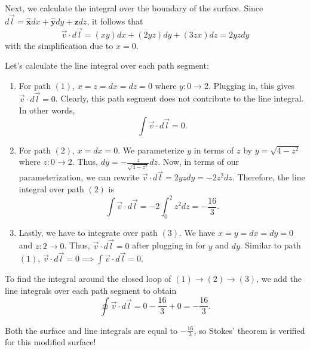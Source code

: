 \documentclass{article}
\newcommand{\xhat}{\hat{\textbf{x}}}
\newcommand{\yhat}{\hat{\textbf{y}}}
\newcommand{\zhat}{\hat{\textbf{z}}}
\begin{document}
Next, we calculate the integral over the boundary of the surface. Since $d\vec{l} = \xhat dx + \yhat dy + \zhat dz$, it follows that
\begin{equation}
	\vec{v}\cdot d\vec{l} = (xy)dx + (2yz)dy + (3zx)dz = 2yz dy
\end{equation}
with the simplification due to $x=0$.

Let's calculate the line integral over each path segment:
\begin{enumerate}
	\item For path $(1)$, $x=z=dx=dz=0$ where $y:0\to2$. Plugging in, this gives $\vec{v}\cdot d\vec{l} = 0$. Clearly, this path segment does not contribute to the line integral. In other words, 
	\begin{equation}
		\int\vec{v}\cdot d\vec{l} = 0.
	\end{equation}
	
	\item For path $(2)$, $x=dx=0$. We parameterize $y$ in terms of $z$ by $y = \sqrt{4-z^2}$ where $z:0\to2$. Thus, $dy = -\frac{z}{\sqrt{4-z^2}}dz$. Now, in terms of our parameterization, we can rewrite $\vec{v}\cdot d\vec{l} = 2yzdy = -2z^2dz$. Therefore, the line integral over path $(2)$ is
	\begin{equation}
		\int\vec{v}\cdot d\vec{l} = -2\int_0^2z^2dz = -\frac{16}{3}.
	\end{equation}

	\item Lastly, we have to integrate over path $(3)$. We have $x=y=dx=dy=0$ and $z:2\to0$. Thus, $\vec{v}\cdot d\vec{l} = 0$ after plugging in for $y$ and $dy$. Similar to path $(1)$, $\vec{v}\cdot d\vec{l} = 0 \implies \int\vec{v}\cdot d\vec{l} = 0$.
\end{enumerate}
To find the integral around the closed loop of $(1)\to(2)\to(3)$, we add the line integrals over each path segment to obtain
\begin{equation}
	\oint\vec{v}\cdot d\vec{l} = 0 - \frac{16}{3} + 0 = -\frac{16}{3}.
\end{equation}

Both the surface and line integrals are equal to $-\frac{16}{3}$, so Stokes' theorem is verified for this modified surface!
\end{document}
